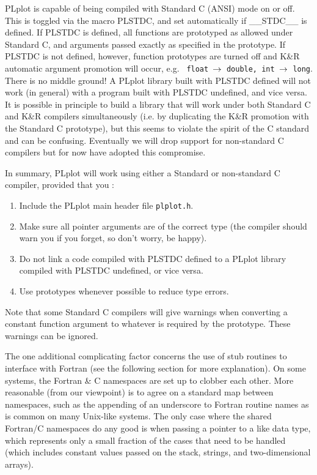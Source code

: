 PLplot is capable of being compiled with Standard C (ANSI) mode on or off.
This is toggled via the macro PLSTDC, and set automatically if \_\_STDC\_\_
is defined.  If PLSTDC is defined, all functions are prototyped as allowed
under Standard C, and arguments passed exactly as specified in the
prototype.  If PLSTDC is not defined, however, function prototypes are
turned off and K\&R automatic argument promotion will occur, e.g.  {\tt
float $\rightarrow$ double, int $\rightarrow$ long}.  There is no middle ground!  A PLplot
library built with PLSTDC defined will not work (in general) with a program
built with PLSTDC undefined, and vice versa.  It is possible in principle to
build a library that will work under both Standard C and K\&R compilers
simultaneously (i.e.  by duplicating the K\&R promotion with the Standard C
prototype), but this seems to violate the spirit of the C standard and can
be confusing.  Eventually we will drop support for non-standard C compilers 
but for now have adopted this compromise.

In summary, PLplot will work using either a Standard or non-standard C
compiler, provided that you :
\begin{enumerate}
\item Include the PLplot main header file {\tt plplot.h}.
\item Make sure all pointer arguments are of the correct type
(the compiler should warn you if you forget, so don't worry, be happy).
\item Do not link a code compiled with PLSTDC defined to a PLplot library
compiled with PLSTDC undefined, or vice versa.
\item Use prototypes whenever possible to reduce type errors.
\end{enumerate}

Note that some Standard C compilers will give warnings when converting a
constant function argument to whatever is required by the prototype.  These
warnings can be ignored.

The one additional complicating factor concerns the use of stub routines to
interface with Fortran (see the following section for more explanation).  On
some systems, the Fortran \& C namespaces are set up to clobber each other.
More reasonable (from our viewpoint) is to agree on a standard map between
namespaces, such as the appending of an underscore to Fortran routine names
as is common on many Unix-like systems.  The only case where the shared
Fortran/C namespaces do any good is when passing a pointer to a like data
type, which represents only a small fraction of the cases that need to
be handled (which includes constant values passed on the stack, strings, and
two-dimensional arrays).

